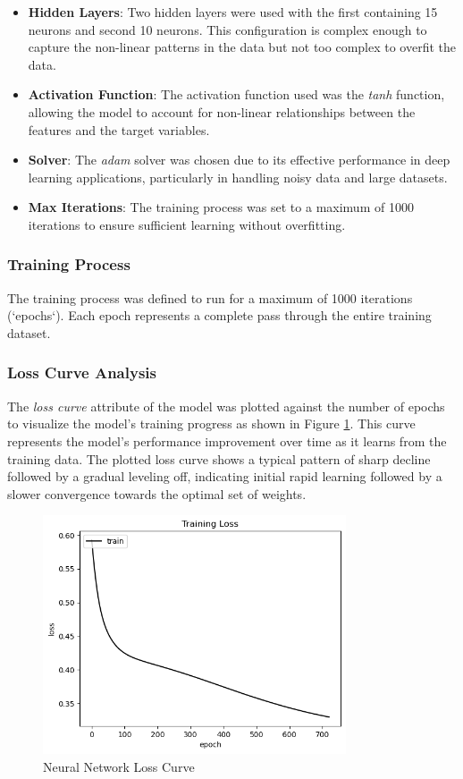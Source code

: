 \begin{itemize}
    \item \textbf{Hidden Layers}: Two hidden layers were used with the first containing 15 neurons and second 10 neurons. This configuration is complex enough to capture the non-linear patterns in the data but
          not too complex to overfit the data.
    \item \textbf{Activation Function}: The activation function used was the \textit{tanh} function, allowing the model to account for non-linear relationships between the features and the target variables.
    \item \textbf{Solver}: The \textit{adam} solver was chosen due to its effective performance in deep learning applications, particularly in handling noisy data and large datasets.
    \item \textbf{Max Iterations}: The training process was set to a maximum of 1000 iterations to ensure sufficient learning without overfitting.
\end{itemize}

\subsubsection*{Training Process} The training process was defined to run for a maximum of 1000 iterations (`epochs`). Each epoch represents a complete pass through the entire training dataset.

\subsubsection*{Loss Curve Analysis} The \textit{loss curve} attribute of the model was plotted against the number of epochs to visualize the model's training progress as shown in Figure
\ref{fig:neural_network_loss_curve}. This curve represents the model's performance improvement over time as it learns from the training data. The plotted loss curve shows a typical pattern
of sharp decline followed by a gradual leveling off, indicating initial rapid learning followed by a slower convergence towards the optimal set of weights.

\begin{figure}[H]
    \centering
    \includegraphics[width=0.8\textwidth]{images/nnCharts/neural_network_loss_curve.png}
    \caption{Neural Network Loss Curve}
    \label{fig:neural_network_loss_curve}
\end{figure}


